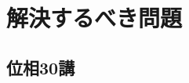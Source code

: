 \documentclass{jarticle}
\begin{document}
\title{}
\author{}
\maketitle
\begin{abstract}
    吾輩は猫になりたい。
\end{abstract}
\tableofcontents
\clearpage

\section{解決するべき問題}
\subsection{位相30講}



\newpage

\end{document}
